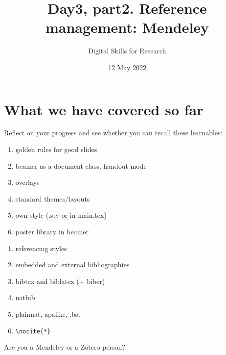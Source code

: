 \documentclass[a4paper,11pt]{article}
\title{Day3, part2. Reference management: Mendeley}
\author{Digital Skills for Research}
\date{12 May 2022}
\begin{document}
\maketitle
\tableofcontents

\section*{What we have covered so far}

Reflect on your progress and see whether you can recall these learnables:

\bigskip

\begin{tcolorbox}[width=.475\textwidth, nobeforeafter,height=6.5cm,valign=center, fonttitle=\bfseries,title=Slides in Beamer]
	\begin{enumerate}
		\item golden rules for good slides %
		\item beamer as a document class, handout mode
		\item overlays
		\item standard themes/layouts
		\item own style (.sty or in main.tex)
		\item poster library in beamer

	\end{enumerate}
\end{tcolorbox}\hfill
%
\begin{tcolorbox}[width=.475\textwidth, nobeforeafter,height=6.5cm,valign=center,fonttitle=\bfseries,title=Citations]
	\begin{enumerate}
		\item referencing styles
		\item embedded and external bibliographies
		\item bibtex and biblatex (+ biber)
		\item natbib 
		\item plainnat, apalike, .bst
		\item \verb|\nocite{*}|
	\end{enumerate}
\end{tcolorbox}

\bigskip

\begin{tcolorbox}[colback=red!5!white, colframe=red!75!black]
	\centering
	{\Large{Are you a Mendeley or a Zotero person?}}
\end{tcolorbox}
\end{document}
